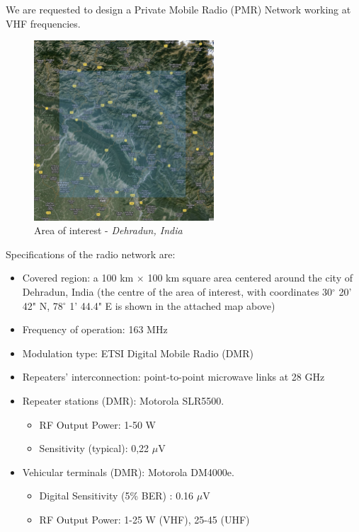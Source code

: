 We are requested to design a Private Mobile Radio (PMR) Network working at VHF
frequencies.
\begin{figure}[H]
    \centering
    \includegraphics[width = 0.6\textwidth]{Images/Area of interest.png}
    \caption{Area of interest - \textit{Dehradun, India}}
    \label{fig:enter-label}
\end{figure}

Specifications of the radio network are:
\begin{itemize}
\item Covered region: a 100 km $\times$ 100 km square area centered around the city of
Dehradun, India (the centre of the area of interest, with coordinates 30$^\circ$ 20' 42" N, 78$^\circ$ 1' 44.4" E is shown in the attached map above)
\item Frequency of operation: 163 MHz
\item Modulation type: ETSI Digital Mobile Radio (DMR)
\item Repeaters’ interconnection: point-to-point microwave links at 28 GHz
\item Repeater stations (DMR): Motorola SLR5500\cite{MotorolaSLR5500}.
\begin{itemize}
    \item RF Output Power: 1-50 W
    \item Sensitivity (typical): 0,22 $\mu$V 
\end{itemize}
\item Vehicular terminals (DMR): Motorola DM4000e\cite{MotorolaDME4000E}.
\begin{itemize}
    \item Digital Sensitivity (5\% BER) : 0.16 $\mu$V
    \item RF Output Power: 1-25 W (VHF), 25-45 (UHF) 
\end{itemize}
\end{itemize}